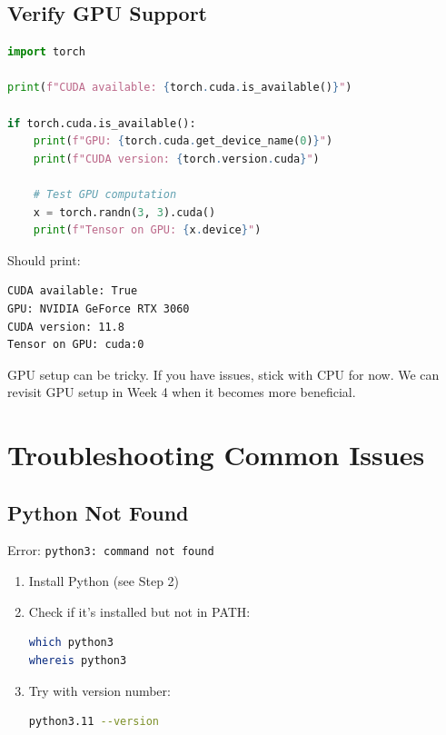 \documentclass[11pt,a4paper]{article}
\begin{document}
\subsection{Verify GPU Support}

\begin{lstlisting}[language=Python]
import torch

print(f"CUDA available: {torch.cuda.is_available()}")

if torch.cuda.is_available():
    print(f"GPU: {torch.cuda.get_device_name(0)}")
    print(f"CUDA version: {torch.version.cuda}")
    
    # Test GPU computation
    x = torch.randn(3, 3).cuda()
    print(f"Tensor on GPU: {x.device}")
\end{lstlisting}

Should print:
\begin{lstlisting}
CUDA available: True
GPU: NVIDIA GeForce RTX 3060
CUDA version: 11.8
Tensor on GPU: cuda:0
\end{lstlisting}

\begin{warningbox}
GPU setup can be tricky. If you have issues, stick with CPU for now. We can revisit GPU setup in Week 4 when it becomes more beneficial.
\end{warningbox}

\section{Troubleshooting Common Issues}

\subsection{Python Not Found}

\begin{problembox}
Error: \texttt{python3: command not found}
\end{problembox}

\begin{solutionbox}
\begin{enumerate}
    \item Install Python (see Step 2)
    \item Check if it's installed but not in PATH:
    \begin{lstlisting}[language=bash]
which python3
whereis python3
    \end{lstlisting}
    \item Try with version number:
    \begin{lstlisting}[language=bash]
python3.11 --version
    \end{lstlisting}
\end{enumerate}
\end{solutionbox}
\end{document}

